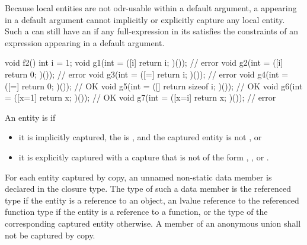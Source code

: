 \pnum
\begin{note}
Because local entities are not
odr-usable within a default argument,
a  appearing in a default argument
cannot implicitly or explicitly capture any local entity.
Such a 
can still have an  if
any full-expression in its 
satisfies the constraints of an expression appearing in
a default argument.
\end{note}
\begin{example}
\begin{codeblock}
void f2() {
  int i = 1;
  void g1(int = ([i]{ return i; })());          // error
  void g2(int = ([i]{ return 0; })());          // error
  void g3(int = ([=]{ return i; })());          // error
  void g4(int = ([=]{ return 0; })());          // OK
  void g5(int = ([]{ return sizeof i; })());    // OK
  void g6(int = ([x=1]{ return x; })());        // OK
  void g7(int = ([x=i]{ return x; })());        // error
}
\end{codeblock}
\end{example}

\pnum
An entity is  if
\begin{itemize}
\item
it is implicitly captured,
the  is \tcode{=}, and
the captured entity is not , or
\item
it is explicitly captured with a capture that is not of the form
,
\tcode{\&}  , or
\tcode{\&}   .
\end{itemize}
For each entity captured by copy, an
unnamed non-static data member is declared in the closure type.
The type of such a data member is the referenced type if the entity is a reference to an object,
an lvalue reference to the referenced function type if the entity is a reference to a function,
or the type of the corresponding captured entity otherwise.
A member of an anonymous union shall not be captured by copy.

